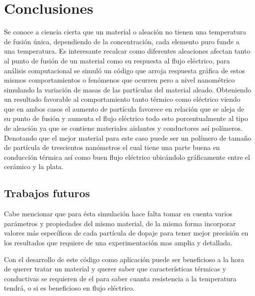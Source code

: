 \documentclass[3pt,twocolumn]{elsarticle}
\begin{document}
\section{Conclusiones}\label{intr}
Se conoce a ciencia cierta que un material o aleación no tienen una temperatura de fusión única, dependiendo de la concentración, cada elemento puro funde a una temperatura. Es interesante recalcar como diferentes aleaciones afectan tanto al punto de fusión de un material como su respuesta al flujo eléctrico, para análisis computacional se simuló un código que arroja respuesta gráfica de estos mismos comportamientos o fenómenos que ocurren pero a nivel nanométrico simulando la variación de masas de las partículas del material aleado. 
Obteniendo un resultado favorable al comportamiento tanto térmico como eléctrico viendo que en ambos casos el aumento de partícula favorece en relación que se aleja de su punto de fusión y aumenta el flujo eléctrico todo esto porcentualmente al tipo de aleación ya que se contiene materiales aislantes y conductores así polímeros. Denotando que el mejor material para este caso puede ser un polímero de tamaño de partícula de trescientos nanómetros el cual tiene una parte buena en conducción térmica así como buen flujo eléctrico ubicándolo gráficamente entre el cerámico y la plata.

\subsection{Trabajos futuros}
Cabe mencionar que para ésta simulación hace falta tomar en cuenta varios parámetros y propiedades del mismo material, de la misma forma incorporar valores más específicos de cada partícula de dopaje para tener mejor precisión en los resultados que requiere de una experimentación mas amplia y detallada. 

Con el desarrollo de este código como aplicación puede ser beneficioso a la hora de querer tratar un material y querer saber que características térmicas y conductivas se requieren de el para saber cuanta resistencia a la temperatura tendrá, o si es beneficioso en flujo eléctrico.



\end{document}
